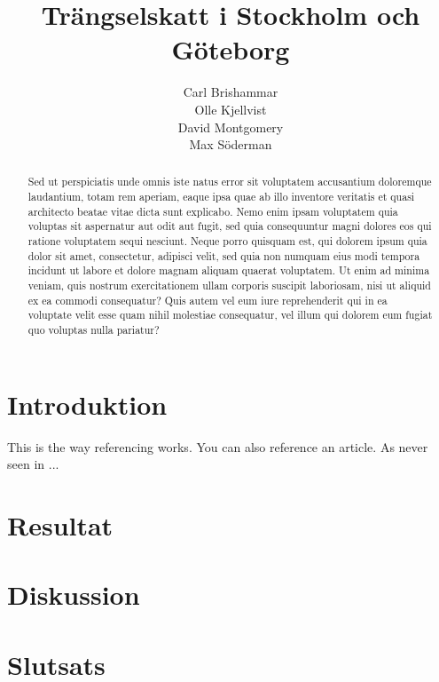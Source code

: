 \documentclass{amsart}
\title{Trängselskatt i Stockholm och Göteborg}
\author{Carl Brishammar \\ Olle Kjellvist \\ David Montgomery \\ Max Söderman}
\date{}
\begin{document}
\begin{abstract}
	Sed ut perspiciatis unde omnis iste natus error sit voluptatem accusantium doloremque laudantium, totam rem aperiam, eaque ipsa quae ab illo inventore veritatis et quasi architecto beatae vitae dicta sunt explicabo. Nemo enim ipsam voluptatem quia voluptas sit aspernatur aut odit aut fugit, sed quia consequuntur magni dolores eos qui ratione voluptatem sequi nesciunt. Neque porro quisquam est, qui dolorem ipsum quia dolor sit amet, consectetur, adipisci velit, sed quia non numquam eius modi tempora incidunt ut labore et dolore magnam aliquam quaerat voluptatem. Ut enim ad minima veniam, quis nostrum exercitationem ullam corporis suscipit laboriosam, nisi ut aliquid ex ea commodi consequatur? Quis autem vel eum iure reprehenderit qui in ea voluptate velit esse quam nihil molestiae consequatur, vel illum qui dolorem eum fugiat quo voluptas nulla pariatur?
\end{abstract}
\maketitle
\newpage
\tableofcontents
\newpage
\section{Introduktion}
This is the way referencing works. \parencite{book}
You can also reference an article. As never seen in \textcite{article}...

\section{Resultat}

\section{Diskussion}

\section{Slutsats}

\newpage
\printbibliography
\end{document}
